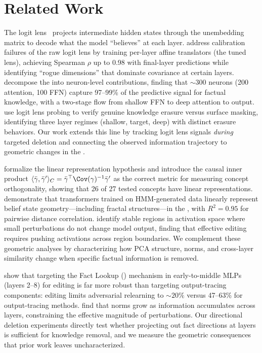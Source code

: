 \section{Related Work}
\label{sec:related_work}

The logit lens~\citep{nostalgebraist2020logitlens} projects intermediate hidden states through the unembedding matrix to decode what the model ``believes'' at each layer. \citet{belrose2023tuned} address calibration failures of the raw logit lens by training per-layer affine translators (the tuned lens), achieving Spearman $\rho$ up to 0.98 with final-layer predictions while identifying ``rogue dimensions'' that dominate covariance at certain layers. \citet{yu2023neuron} decompose the \residstream into neuron-level contributions, finding that ${\sim}300$ neurons (200 attention, 100 FFN) capture 97--99\% of the predictive signal for factual knowledge, with a two-stage flow from shallow FFN to deep attention to output. \citet{li2026layer} use logit lens probing to verify genuine knowledge erasure versus surface masking, identifying three layer regimes (shallow, target, deep) with distinct erasure behaviors. Our work extends this line by tracking logit lens signals \emph{during} targeted deletion and connecting the observed information trajectory to geometric changes in the \residstream.

\citet{park2023linear} formalize the linear representation hypothesis and introduce the causal inner product $\langle \bar{\gamma}, \bar{\gamma}' \rangle_C = \bar{\gamma}^\top \Cov(\gamma)^{-1} \bar{\gamma}'$ as the correct metric for measuring concept orthogonality, showing that 26 of 27 tested concepts have linear representations. \citet{shai2024belief} demonstrate that transformers trained on HMM-generated data linearly represent belief state geometry---including fractal structures---in the \residstream, with $R^2 = 0.95$ for pairwise distance correlation. \citet{janiak2024stable} identify stable regions in activation space where small perturbations do not change model output, finding that effective editing requires pushing activations across region boundaries. We complement these geometric analyses by characterizing how PCA structure, norms, and cross-layer similarity change when specific factual information is removed.

\citet{ghosh2024mechanistic} show that targeting the Fact Lookup (\flu) mechanism in early-to-middle MLPs (layers 2--8) for editing is far more robust than targeting output-tracing components: \flu editing limits adversarial relearning to ${\sim}20\%$ versus 47--63\% for output-tracing methods. \citet{gromov2024secretly} find that \residstream norms grow as information accumulates across layers, constraining the effective magnitude of perturbations. Our directional deletion experiments directly test whether projecting out fact directions at \flu layers is sufficient for knowledge removal, and we measure the geometric consequences that prior work leaves uncharacterized.
